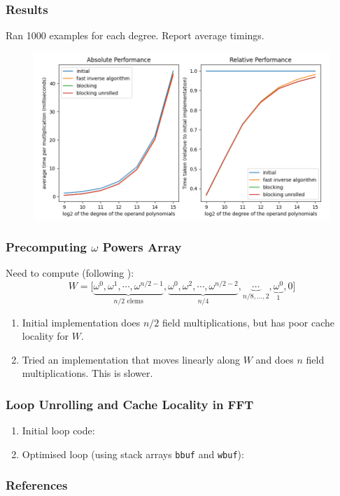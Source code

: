 \documentclass{beamer}
\begin{document}
\begin{frame}
    \frametitle{Results}
    
    Ran 1000 examples for each degree. Report average timings.

    \begin{figure}
        \includegraphics[width=\textwidth]{fastmult.png}
    \end{figure}
\end{frame}

\begin{frame}
    \frametitle{Precomputing $\omega$ Powers Array}

    Need to compute (following \cite{monagan}):
    \begin{equation*}
        W = \big[
            \underbrace{\omega^0, \omega^1, \cdots, \omega^{n/2 - 1}}_{n/2 \text{ elems}},
            \underbrace{\omega^0, \omega^2, \cdots, \omega^{n/2 - 2}}_{n/4},
            \underbrace{\cdots}_{n/8,\dots,2},
            \underbrace{\omega^0}_{1},
            0
        \big]
    \end{equation*}
    
    \pause \vfill

    \begin{enumerate}[label=(\roman*)]
        \item Initial implementation does $n/2$ field multiplications,
            but has poor cache locality for $W$. \pause \smallbreak
        \item Tried an implementation that moves linearly along $W$ and does $n$ 
            field multiplications. \pause This is slower.
    \end{enumerate}
\end{frame}

\begin{frame}
    \frametitle{Loop Unrolling and Cache Locality in FFT}

    \begin{enumerate}[label=(\roman*)]
        \item Initial loop code:
            
            \pause \smallbreak
        \item Optimised loop (using stack arrays \texttt{bbuf} and
            \texttt{wbuf}): \pause
            
    \end{enumerate}
\end{frame}

\begin{frame}
    \frametitle{References}

    
    
\end{frame}
\end{document}
